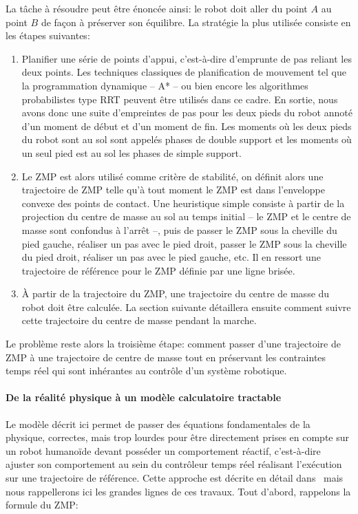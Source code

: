 La tâche à résoudre peut être énoncée ainsi: le robot doit aller du
point $A$ au point $B$ de façon à préserver son équilibre. La
stratégie la plus utilisée consiste en les étapes suivantes:
\begin{enumerate}
\item Planifier une série de points d'appui, c'est-à-dire d'emprunte
  de pas reliant les deux points. Les techniques classiques de
  planification de mouvement tel que la programmation dynamique -- A*
  -- ou bien encore les algorithmes probabilistes type RRT peuvent
  être utilisés dans ce cadre. En sortie, nous avons donc une suite
  d'empreintes de pas pour les deux pieds du robot annoté d'un moment
  de début et d'un moment de fin. Les moments où les deux pieds du
  robot sont au sol sont appelés phases de double support et les
  moments où un seul pied est au sol les phases de simple support.
\item Le ZMP est alors utilisé comme critère de stabilité, on définit
  alors une trajectoire de ZMP telle qu'à tout moment le ZMP est dans
  l'enveloppe convexe des points de contact. Une heuristique simple
  consiste à partir de la projection du centre de masse au sol au
  temps initial -- le ZMP et le centre de masse sont confondus à
  l'arrêt --, puis de passer le ZMP sous la cheville du pied gauche,
  réaliser un pas avec le pied droit, passer le ZMP sous la cheville
  du pied droit, réaliser un pas avec le pied gauche, etc. Il en
  ressort une trajectoire de référence pour le ZMP définie par une
  ligne brisée.
\item À partir de la trajectoire du ZMP, une trajectoire du centre de
  masse du robot doit être calculée. La section suivante détaillera
  ensuite comment suivre cette trajectoire du centre de masse pendant
  la marche.
\end{enumerate}

Le problème reste alors la troisième étape: comment passer d'une
trajectoire de ZMP à une trajectoire de centre de masse tout en
préservant les contraintes temps réel qui sont inhérantes au contrôle
d'un système robotique.

\paragraph{De la réalité physique à un modèle calculatoire tractable}


Le modèle décrit ici permet de passer des équations fondamentales de
la physique, correctes, mais trop lourdes pour être directement prises
en compte sur un robot humanoïde devant posséder un comportement
réactif, c'est-à-dire ajuster son comportement au sein du contrôleur
temps réel réalisant l'exécution sur une trajectoire de
référence. Cette approche est décrite en détail
dans \cite{10perrin.icra} mais nous rappellerons ici les grandes lignes
de ces travaux. Tout d'abord, rappelons la formule du ZMP:

